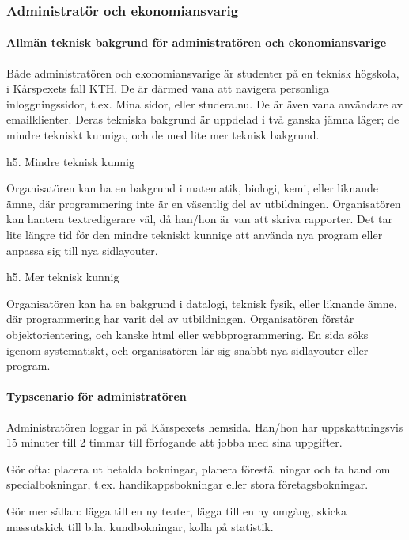 \documentclass[a4paper, twoside, 11pt, titlepage]{article}
\begin{document}
	\subsubsection{Administratör och ekonomiansvarig}



			\paragraph{Allmän teknisk bakgrund för administratören och ekonomiansvarige}

			Både administratören och ekonomiansvarige är studenter på en teknisk högskola, i Kårspexets fall KTH. De är därmed vana att navigera personliga inloggningssidor, t.ex. Mina sidor, eller studera.nu. De är även vana användare av emailklienter. Deras tekniska bakgrund är uppdelad i två ganska jämna läger; de mindre tekniskt kunniga, och de med lite mer teknisk bakgrund. 

			h5. Mindre teknisk kunnig

			Organisatören kan ha en bakgrund i matematik, biologi, kemi, eller liknande ämne, där programmering inte är en väsentlig del av utbildningen. Organisatören kan hantera textredigerare väl, då han/hon är van att skriva rapporter. Det tar lite längre tid för den mindre tekniskt kunnige att använda nya program eller anpassa sig till nya sidlayouter.

			h5. Mer teknisk kunnig

			Organisatören kan ha en bakgrund i datalogi, teknisk fysik, eller liknande ämne, där programmering har varit del av utbildningen. Organisatören förstår objektorientering, och kanske html eller webbprogrammering. En sida söks igenom systematiskt, och organisatören lär sig snabbt nya sidlayouter eller program.

			\paragraph{Typscenario för administratören}

			Administratören loggar in på Kårspexets hemsida. Han/hon har uppskattningsvis 15 minuter till 2 timmar till förfogande att jobba med sina uppgifter. 

			Gör ofta: placera ut betalda bokningar, planera föreställningar och ta hand om specialbokningar, t.ex. handikappsbokningar eller stora företagsbokningar. 

			Gör mer sällan: lägga till en ny teater, lägga till en ny omgång, skicka massutskick till b.la. kundbokningar, kolla på statistik.
\end{document}
